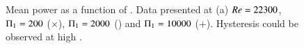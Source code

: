 \begin{figure}
  \setlength{\unitlength}{\textwidth}
  \caption{Mean power as a function of \massdamp. Data presented at (a) $Re=22300$, $\Pi_1=200$ ($\times$), $\Pi_1=2000$ () and $\Pi_1=10000$ (+). Hysteresis could be observed at high \reynoldsnumber.}
    \label{fig:collapsed_data}
\end{figure}

